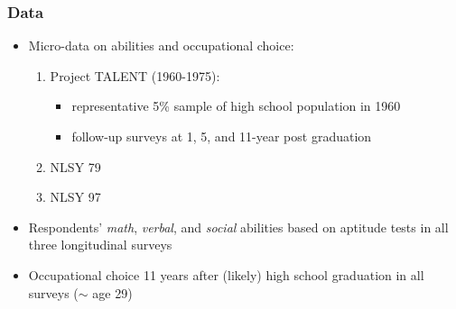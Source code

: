 \documentclass[11pt,hyperref={bookmarks=false},table,aspectratio=169]{beamer}
\begin{document}

\begin{frame}
\frametitle{Data}
\begin{itemize}
	\item Micro-data on abilities and occupational choice:
	\begin{enumerate}
		\item Project TALENT (1960-1975):
		\begin{itemize}
			\item representative 5\% sample of high school population in 1960
			\item follow-up surveys at 1, 5, and 11-year post graduation
		\end{itemize}
		\item NLSY 79
		\item NLSY 97
	\end{enumerate}
	\item Respondents' \textit{math}, \textit{verbal}, and \textit{social} abilities based on aptitude tests in all three longitudinal surveys
	\item Occupational choice 11 years after (likely) high school graduation in all surveys ($\sim$ age 29)
\end{itemize}
\end{frame}

\end{document}
